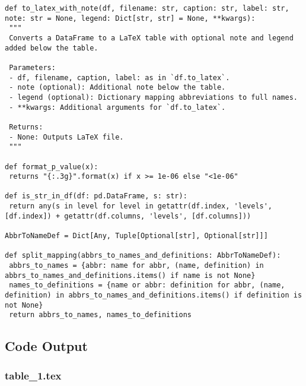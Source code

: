 \documentclass[11pt]{article}
\begin{document}
\begin{verbatim}
def to_latex_with_note(df, filename: str, caption: str, label: str, note: str = None, legend: Dict[str, str] = None, **kwargs):
 """
 Converts a DataFrame to a LaTeX table with optional note and legend added below the table.

 Parameters:
 - df, filename, caption, label: as in `df.to_latex`.
 - note (optional): Additional note below the table.
 - legend (optional): Dictionary mapping abbreviations to full names.
 - **kwargs: Additional arguments for `df.to_latex`.

 Returns:
 - None: Outputs LaTeX file.
 """

def format_p_value(x):
 returns "{:.3g}".format(x) if x >= 1e-06 else "<1e-06"

def is_str_in_df(df: pd.DataFrame, s: str):
 return any(s in level for level in getattr(df.index, 'levels', [df.index]) + getattr(df.columns, 'levels', [df.columns]))

AbbrToNameDef = Dict[Any, Tuple[Optional[str], Optional[str]]]

def split_mapping(abbrs_to_names_and_definitions: AbbrToNameDef):
 abbrs_to_names = {abbr: name for abbr, (name, definition) in abbrs_to_names_and_definitions.items() if name is not None}
 names_to_definitions = {name or abbr: definition for abbr, (name, definition) in abbrs_to_names_and_definitions.items() if definition is not None}
 return abbrs_to_names, names_to_definitions

\end{verbatim}



\subsection{Code Output}

\subsubsection*{table\_1.tex}
\end{document}
